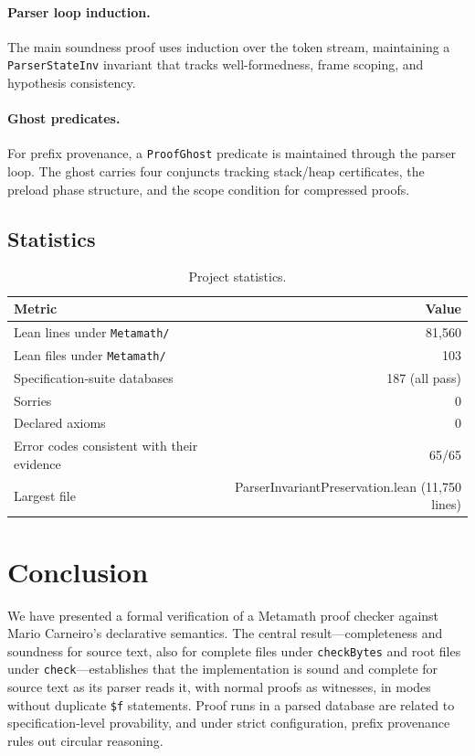 \documentclass[11pt]{article}
\newcommand{\lean}[1]{\lstinline[language=Lean4]{#1}}
\begin{document}
\paragraph{Parser loop induction.}
The main soundness proof uses induction over the token stream,
maintaining a \lean{ParserStateInv} invariant that tracks
well-formedness, frame scoping, and hypothesis consistency.

\paragraph{Ghost predicates.}
For prefix provenance, a \lean{ProofGhost} predicate is maintained
through the parser loop.  The ghost carries four conjuncts tracking
stack/heap certificates, the preload phase structure, and the scope
condition for compressed proofs.

\subsection{Statistics}

\begin{table}[ht]
\centering
\caption{Project statistics.}
\label{tab:stats}
\begin{tabular}{lr}
\toprule
\textbf{Metric} & \textbf{Value} \\
\midrule
Lean lines under \texttt{Metamath/} & 81{,}560 \\
Lean files under \texttt{Metamath/} & 103 \\
Specification-suite databases & 187 (all pass) \\
Sorries & 0 \\
Declared axioms & 0 \\
Error codes consistent with their evidence & 65/65 \\
Largest file & ParserInvariantPreservation.lean (11{,}750 lines) \\
\bottomrule
\end{tabular}
\end{table}

\section{Conclusion}
\label{sec:conclusion}

We have presented a formal verification of a Metamath proof checker
against Mario Carneiro's declarative semantics.  The central
result---completeness and soundness for source text, also for complete
files under \lean{checkBytes} and root files under \lean{check}---establishes
that the implementation is sound and complete for source text as its
parser reads it, with normal proofs as witnesses, in modes without
duplicate \verb|$f| statements.  Proof runs in a parsed database are
related to specification-level provability, and under strict
configuration, prefix provenance rules out circular reasoning.
\end{document}
